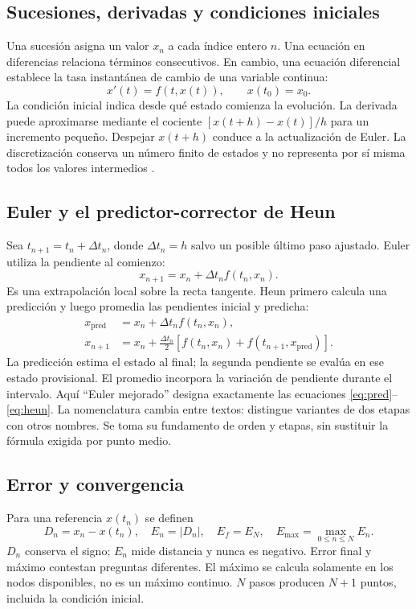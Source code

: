 \documentclass[11pt,a4paper]{article}
\begin{document}
\subsection{Sucesiones, derivadas y condiciones iniciales}
Una sucesión asigna un valor $x_n$ a cada índice entero $n$. Una ecuación en diferencias relaciona términos consecutivos. En cambio, una ecuación diferencial establece la tasa instantánea de cambio de una variable continua:
\begin{equation}\label{eq:edo}
x'(t)=f(t,x(t)),\qquad x(t_0)=x_0.
\end{equation}
La condición inicial indica desde qué estado comienza la evolución. La derivada puede aproximarse mediante el cociente $[x(t+h)-x(t)]/h$ para un incremento pequeño. Despejar $x(t+h)$ conduce a la actualización de Euler. La discretización conserva un número finito de estados y no representa por sí misma todos los valores intermedios \parencite{euler}.

\subsection{Euler y el predictor-corrector de Heun}
Sea $t_{n+1}=t_n+\Delta t_n$, donde $\Delta t_n=h$ salvo un posible último paso ajustado. Euler utiliza la pendiente al comienzo:
\begin{equation}\label{eq:euler}
x_{n+1}=x_n+\Delta t_n f(t_n,x_n).
\end{equation}
Es una extrapolación local sobre la recta tangente. Heun primero calcula una predicción y luego promedia las pendientes inicial y predicha:
\begin{align}
x_{\mathrm{pred}}&=x_n+\Delta t_n f(t_n,x_n),\label{eq:pred}\\
x_{n+1}&=x_n+\frac{\Delta t_n}{2}\left[f(t_n,x_n)+f(t_{n+1},x_{\mathrm{pred}})\right].\label{eq:heun}
\end{align}
La predicción estima el estado al final; la segunda pendiente se evalúa en ese estado provisional. El promedio incorpora la variación de pendiente durante el intervalo. Aquí ``Euler mejorado'' designa exactamente las ecuaciones \ref{eq:pred}--\ref{eq:heun}. La nomenclatura cambia entre textos: \textcite{rk} distingue variantes de dos etapas con otros nombres. Se toma su fundamento de orden y etapas, sin sustituir la fórmula exigida por punto medio.

\subsection{Error y convergencia}
Para una referencia $x(t_n)$ se definen
\begin{equation}\label{eq:error}
D_n=x_n-x(t_n),\quad E_n=|D_n|,\quad E_f=E_N,\quad E_{\max}=\max_{0\le n\le N}E_n.
\end{equation}
$D_n$ conserva el signo; $E_n$ mide distancia y nunca es negativo. Error final y máximo contestan preguntas diferentes. El máximo se calcula solamente en los nodos disponibles, no es un máximo continuo. $N$ pasos producen $N+1$ puntos, incluida la condición inicial.
\end{document}
